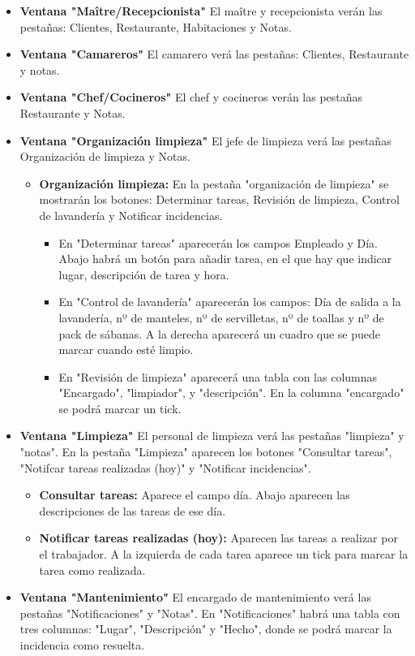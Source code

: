 \documentclass[spanish,a4paper,12pt]{report}		%
\begin{document}
\begin{itemize}
				 \item \textbf{Ventana "Maître/Recepcionista" } El maître y recepcionista verán las pestañas: Clientes, Restaurante, Habitaciones y Notas. 
				 \item \textbf{Ventana "Camareros" }El camarero verá las pestañas: Clientes, Restaurante y notas. 	
				 \item \textbf{Ventana "Chef/Cocineros" }El chef y cocineros verán las pestañas Restaurante y Notas. 
				 \item \textbf{Ventana "Organización limpieza" }El jefe de limpieza verá las pestañas Organización de limpieza y Notas. 
					\begin{itemize}
						 \item \textbf{Organización limpieza: }En la pestaña "organización de limpieza" se mostrarán los botones: Determinar tareas, Revisión de limpieza, Control de lavandería y Notificar incidencias. 
						 \begin{itemize}
							\item En "Determinar tareas" aparecerán los campos Empleado y Día. Abajo habrá un botón para añadir tarea, en el que hay que indicar lugar, descripción de tarea y hora.
							\item En "Control de lavandería" aparecerán los campos: Día de salida a la lavandería, nº de manteles, nº de servilletas, nº de toallas y nº de pack de sábanas. A la derecha aparecerá un cuadro que se puede marcar cuando esté limpio. 
							\item En "Revisión de limpieza" aparecerá una tabla con las columnas "Encargado", "limpiador", y "descripción". En la columna "encargado" se podrá marcar un tick. 	
						\end{itemize}
					\end{itemize}
				 \item \textbf{Ventana "Limpieza" }El personal de limpieza verá las pestañas "limpieza" y "notas". En la pestaña "Limpieza" aparecen los botones "Consultar tareas", "Notifcar tareas realizadas (hoy)" y "Notificar incidencias".
					\begin{itemize}
						\item \textbf{Consultar tareas: }Aparece el campo día. Abajo aparecen las descripciones de las tareas de ese día. 
						 \item \textbf{Notificar tareas realizadas (hoy): }Aparecen las tareas a realizar por el trabajador. A la izquierda de cada tarea aparece un tick para marcar la tarea como realizada. 
					\end{itemize}
				 \item \textbf{Ventana "Mantenimiento" } El encargado de mantenimiento verá las pestañas "Notificaciones" y "Notas". En "Notificaciones" habrá una tabla con tres columnas: "Lugar", "Descripción" y "Hecho", donde se podrá marcar la incidencia como resuelta. 
			\end{itemize}
\end{document}
